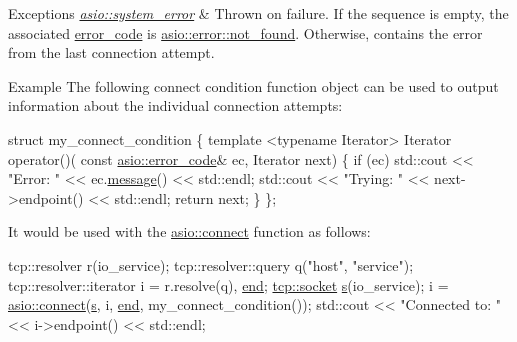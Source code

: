 \begin{DoxyExceptions}{Exceptions}
{\em \hyperlink{classasio_1_1system__error}{asio\+::system\+\_\+error}} & Thrown on failure. If the sequence is empty, the associated {\ttfamily \hyperlink{classasio_1_1error__code}{error\+\_\+code}} is \hyperlink{namespaceasio_1_1error_ade61a402d1dfb10b1c223906f5ea7847a6cfdfb1e108e927e2bfc847850ba0dcb}{asio\+::error\+::not\+\_\+found}. Otherwise, contains the error from the last connection attempt.\\
\hline
\end{DoxyExceptions}
\begin{DoxyParagraph}{Example}
The following connect condition function object can be used to output information about the individual connection attempts\+: 
\begin{DoxyCode}
 \textcolor{keyword}{struct }my\_connect\_condition
\{
  \textcolor{keyword}{template} <\textcolor{keyword}{typename} Iterator>
  Iterator operator()(
      \textcolor{keyword}{const} \hyperlink{classasio_1_1error__code}{asio::error\_code}& ec,
      Iterator next)
  \{
    \textcolor{keywordflow}{if} (ec) std::cout << \textcolor{stringliteral}{"Error: "} << ec.\hyperlink{classasio_1_1error__code_a9e15b346b9ec23275530835d9c150711}{message}() << std::endl;
    std::cout << \textcolor{stringliteral}{"Trying: "} << next->endpoint() << std::endl;
    \textcolor{keywordflow}{return} next;
  \}
\}; 
\end{DoxyCode}
 It would be used with the \hyperlink{group__connect_ga29acd61d7a875cef7dbd1f892be2906c}{asio\+::connect} function as follows\+: 
\begin{DoxyCode}
 tcp::resolver r(io\_service);
tcp::resolver::query q(\textcolor{stringliteral}{"host"}, \textcolor{stringliteral}{"service"});
tcp::resolver::iterator i = r.resolve(q), \hyperlink{group__async__connect_gadb6ad0193229ae84828688e812cd325c}{end};
\hyperlink{namespacewebsocketpp_1_1transport_1_1asio_1_1socket_1_1error_a828ddaa5ed63a761e1b557465a35f05aa0c31b356014843e1d09514e794a539a7}{tcp::socket} \hyperlink{group__async__connect_ga31ab74b9ea6c77932dddd016cfc7920a}{s}(io\_service);
i = \hyperlink{group__connect_ga29acd61d7a875cef7dbd1f892be2906c}{asio::connect}(\hyperlink{group__async__connect_ga31ab74b9ea6c77932dddd016cfc7920a}{s}, i, \hyperlink{group__async__connect_gadb6ad0193229ae84828688e812cd325c}{end}, my\_connect\_condition());
std::cout << \textcolor{stringliteral}{"Connected to: "} << i->endpoint() << std::endl; 
\end{DoxyCode}
 
\end{DoxyParagraph}


